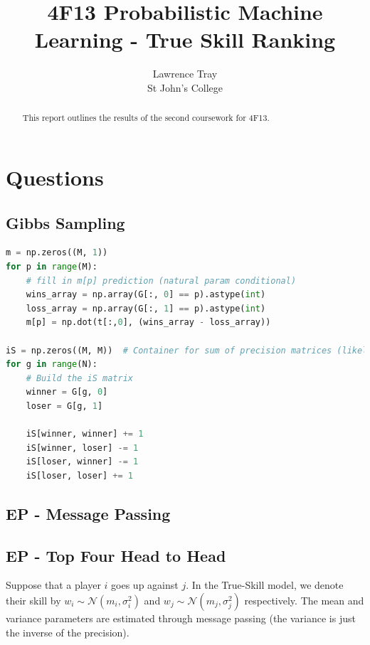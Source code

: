 \documentclass[]{article}
\title{4F13 Probabilistic Machine Learning - True Skill Ranking}
\author{Lawrence Tray \\ St John's College}
\newcommand{\Ncal}{\mathcal{N}}
\begin{document}


\setcounter{page}{1}
\maketitle

\begin{abstract}
This report outlines the results of the second coursework for 4F13. 
\end{abstract}

\tableofcontents

\section{Questions}
\subsection{Gibbs Sampling}

\begin{lstlisting}[frame=single, caption={Gibbs sampling additions}, label={lst:gibbs}, language={python}]
m = np.zeros((M, 1))
for p in range(M):
	# fill in m[p] prediction (natural param conditional)
	wins_array = np.array(G[:, 0] == p).astype(int)
	loss_array = np.array(G[:, 1] == p).astype(int)
	m[p] = np.dot(t[:,0], (wins_array - loss_array))
	
iS = np.zeros((M, M))  # Container for sum of precision matrices (likelihood terms)
for g in range(N):
	# Build the iS matrix
	winner = G[g, 0]
	loser = G[g, 1]
	
	iS[winner, winner] += 1
	iS[winner, loser] -= 1
	iS[loser, winner] -= 1
	iS[loser, loser] += 1
\end{lstlisting}

\subsection{EP - Message Passing}


\subsection{EP - Top Four Head to Head}

Suppose that a player $i$ goes up against $j$. In the True-Skill model, we denote their skill by $w_i \sim \Ncal(m_i, \sigma_i^2)$ and $w_j \sim \Ncal(m_j, \sigma_j^2)$ respectively. The mean and variance parameters are estimated through message passing (the variance is just the inverse of the precision). 
\end{document}
